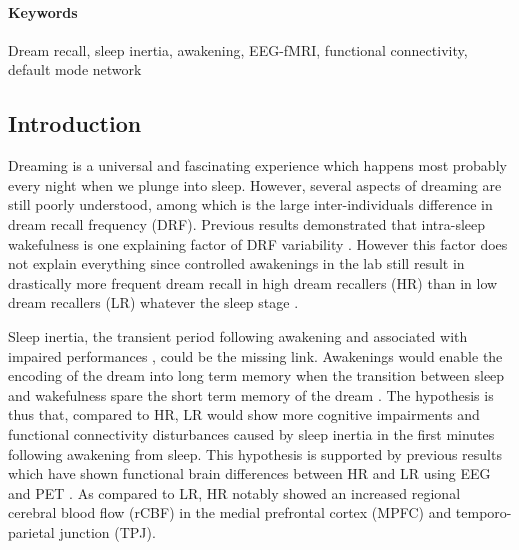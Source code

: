 \paragraph{Keywords}
Dream recall, sleep inertia, awakening, EEG-fMRI, functional connectivity, default mode network

\subsection*{Introduction}
\label{res:inertia:drf:intro}

Dreaming is a universal and fascinating experience which happens most probably every night when we plunge into sleep. However, several aspects of dreaming are still poorly understood, among which is the large inter-individuals difference in dream recall frequency (DRF). Previous results demonstrated that intra-sleep wakefulness is one explaining factor of DRF variability \citep{eichenlaub_brain_2014, vallat_increased_2017}. However this factor does not explain everything since controlled awakenings in the lab still result in drastically more frequent dream recall in high dream recallers (HR) than in low dream recallers (LR) whatever the sleep stage \citep{goodenough_comparison_1959, eichenlaub_resting_2014, eichenlaub_brain_2014}.

Sleep inertia, the transient period following awakening and associated with impaired performances \citep{tassi_sleep_2000, trotti_waking_2016}, could be the missing link. Awakenings would enable the encoding of the dream into long term memory when the transition between sleep and wakefulness spare the short term memory of the dream \citep{koulack_dream_1976}. The hypothesis is thus that, compared to HR, LR would show more cognitive impairments and functional connectivity disturbances caused by sleep inertia in the first minutes following awakening from sleep. This hypothesis is supported by previous results which have shown functional brain differences between HR and LR using EEG \citep{eichenlaub_brain_2014} and PET \citep{eichenlaub_resting_2014}. As compared to LR, HR notably showed an increased regional cerebral blood flow (rCBF) in the medial prefrontal cortex (MPFC) and temporo-parietal junction (TPJ).

